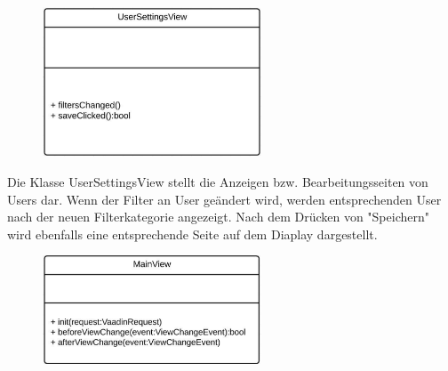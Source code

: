 \begin{itemize}
\begin{itemize}
                                                            \begin{figure}[htb]
                    \centering
                    \includegraphics[width=6.5cm]{Diagramms/class/singleclass/ViewUS.pdf}
                    \end{figure}
                    \newline
                    Die Klasse UserSettingsView stellt die Anzeigen bzw. Bearbeitungsseiten von Users dar.
                    Wenn der Filter an User geändert wird, werden entsprechenden User nach der neuen Filterkategorie angezeigt. Nach dem Drücken von "Speichern" wird ebenfalls eine entsprechende Seite auf dem Diaplay dargestellt. 
                    \begin{itemize}
                    \end{itemize}

                                                            \begin{figure}[htb]
                    \centering
                    \includegraphics[width=6.5cm]{Diagramms/class/singleclass/ViewMain.pdf}
                    \end{figure}
                    \newline
                    \begin{itemize}
                    \end{itemize}


\end{itemize}
\end{itemize}
